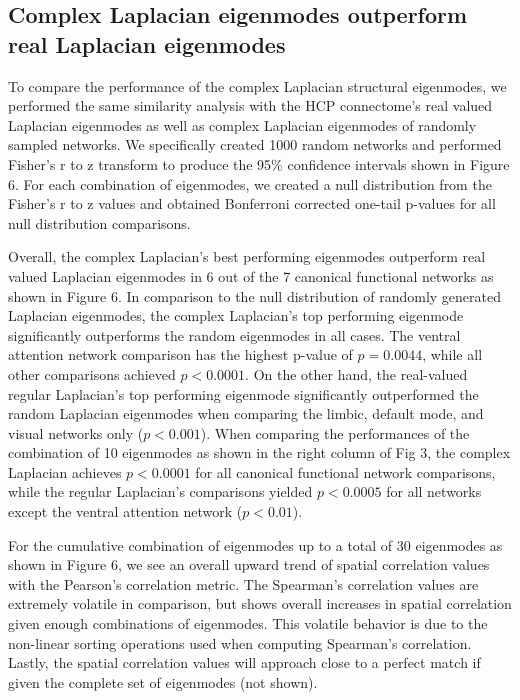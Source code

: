 \documentclass{article}
\begin{document}
\subsection{Complex Laplacian eigenmodes outperform real Laplacian eigenmodes}
To compare the performance of the complex Laplacian structural eigenmodes, we performed the same similarity analysis with the HCP connectome's real valued Laplacian eigenmodes as well as complex Laplacian eigenmodes of randomly sampled networks. We specifically created 1000 random networks and performed Fisher's r to z transform to produce the 95\% confidence intervals shown in Figure 6. For each combination of eigenmodes, we created a null distribution from the Fisher's r to z values and obtained Bonferroni corrected one-tail p-values for all null distribution comparisons. 

Overall, the complex Laplacian's best performing eigenmodes outperform real valued Laplacian eigenmodes in 6 out of the 7 canonical functional networks as shown in Figure 6. In comparison to the null distribution of randomly generated Laplacian eigenmodes, the complex Laplacian's top performing eigenmode significantly outperforms the random eigenmodes in all cases. The ventral attention network comparison has the highest p-value of $p=0.0044$, while all other comparisons achieved $p< 0.0001$. On the other hand, the real-valued regular Laplacian's top performing eigenmode significantly outperformed the random Laplacian eigenmodes when comparing the limbic, default mode, and visual networks only ($p<0.001$). When comparing the performances of the combination of 10 eigenmodes as shown in the right column of Fig 3, the complex Laplacian achieves $p<0.0001$ for all canonical functional network comparisons, while the regular Laplacian's comparisons yielded $p<0.0005$ for all networks except the ventral attention network ($p<0.01$).

For the cumulative combination of eigenmodes up to a total of 30 eigenmodes as shown in Figure 6, we see an overall upward trend of spatial correlation values with the Pearson's correlation metric. The Spearman's correlation values are extremely volatile in comparison, but shows overall increases in spatial correlation given enough combinations of eigenmodes. This volatile behavior is due to the non-linear sorting operations used when computing Spearman's correlation. Lastly, the spatial correlation values will approach close to a perfect match if given the complete set of eigenmodes (not shown).

\end{document}
